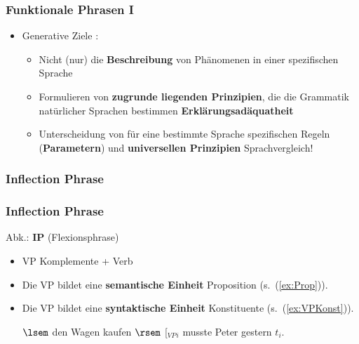 \begin{frame}
\frametitle{Funktionale Phrasen I}

\begin{itemize}
	\item Generative Ziele \citep[vgl.][]{Haegeman94a}:
	\begin{itemize}
\medskip
		\item Nicht (nur) die \textbf{Beschreibung} von Phänomenen in einer spezifischen Sprache
\medskip
		\item Formulieren von \textbf{zugrunde liegenden Prinzipien}, die die Grammatik natürlicher Sprachen bestimmen \ras \textbf{Erklärungsadäquatheit}
\medskip
		\item Unterscheidung von für eine bestimmte Sprache spezifischen Regeln (\textbf{Parametern}) und \textbf{universellen Prinzipien} \ras Sprachvergleich!
	\end{itemize}
	
\end{itemize}

\end{frame}


\subsubsection{Inflection Phrase}

\begin{frame}
\frametitle{Inflection Phrase}

Abk.: \textbf{IP} (Flexionsphrase)

\begin{itemize}
	\item VP \ras Komplemente + Verb

	\item Die VP bildet eine \textbf{semantische Einheit} \ras Proposition (s.\ (\ref{ex:Prop})).

	\item Die VP bildet eine \textbf{syntaktische Einheit} \ras Konstituente (s.\ (\ref{ex:VPKonst})).

	\eal
	\ex\label{ex:Prop} $\lsem$ den Wagen kaufen $\rsem$
	\ex\label{ex:VPKonst} {[}$_{VP}$\alertred{Den Wagen kaufen}{]}$_{i}$ musste Peter gestern $t_i$. 
	\zl
	
\end{itemize}

\nocite{Fries&MyP16h}

\end{frame}



